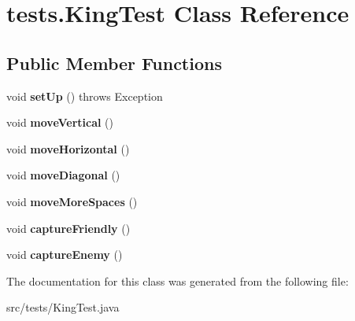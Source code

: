 \hypertarget{classtests_1_1_king_test}{\section{tests.\-King\-Test Class Reference}
\label{classtests_1_1_king_test}
}
\subsection*{Public Member Functions}
\begin{DoxyCompactItemize}
\item 
\hypertarget{classtests_1_1_king_test_aa5d2774b1e0ca4d11420ab13fdc3884c}{void {\bfseries set\-Up} ()  throws Exception }\label{classtests_1_1_king_test_aa5d2774b1e0ca4d11420ab13fdc3884c}

\item 
\hypertarget{classtests_1_1_king_test_a33d47bb640f4df0c2f3c3775dddc705e}{void {\bfseries move\-Vertical} ()}\label{classtests_1_1_king_test_a33d47bb640f4df0c2f3c3775dddc705e}

\item 
\hypertarget{classtests_1_1_king_test_ad1743fed552259c9958bc8b4dff3ec5c}{void {\bfseries move\-Horizontal} ()}\label{classtests_1_1_king_test_ad1743fed552259c9958bc8b4dff3ec5c}

\item 
\hypertarget{classtests_1_1_king_test_a52129f2b5707a86b67d2871b9e880d1a}{void {\bfseries move\-Diagonal} ()}\label{classtests_1_1_king_test_a52129f2b5707a86b67d2871b9e880d1a}

\item 
\hypertarget{classtests_1_1_king_test_acae8a279597c67995ba8b6e7434349f6}{void {\bfseries move\-More\-Spaces} ()}\label{classtests_1_1_king_test_acae8a279597c67995ba8b6e7434349f6}

\item 
\hypertarget{classtests_1_1_king_test_a461c3f492e60f53159e9070dece2c6af}{void {\bfseries capture\-Friendly} ()}\label{classtests_1_1_king_test_a461c3f492e60f53159e9070dece2c6af}

\item 
\hypertarget{classtests_1_1_king_test_adfb0cdf049dcf84bb9518412b34029af}{void {\bfseries capture\-Enemy} ()}\label{classtests_1_1_king_test_adfb0cdf049dcf84bb9518412b34029af}

\end{DoxyCompactItemize}


The documentation for this class was generated from the following file\-:\begin{DoxyCompactItemize}
\item 
src/tests/King\-Test.\-java\end{DoxyCompactItemize}
